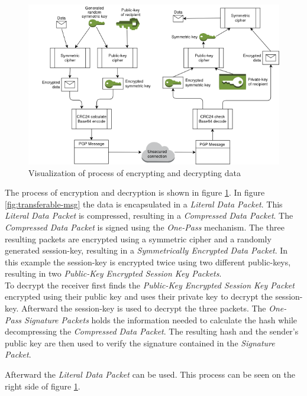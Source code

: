 \begin{figure}[h!]
	\centering
	\includegraphics[width=1\linewidth]{figures/encryption}
	\caption{Visualization of process of encrypting and decrypting data}
	\label{fig:encryption}
\end{figure}


The process of encryption and decryption is shown in figure \ref{fig:encryption}. In figure \ref{fig:transferable-msg} the data is encapsulated in a \textit{Literal Data Packet}. This \textit{Literal Data Packet} is compressed, resulting in a \textit{Compressed Data Packet}. The \textit{Compressed Data Packet} is signed using the \textit{One-Pass} mechanism. The three resulting packets are encrypted using a symmetric cipher and a randomly generated session-key, resulting in a \textit{Symmetrically Encrypted Data Packet}. In this example the session-key is encrypted twice using two different public-keys, resulting in two \textit{Public-Key Encrypted Session Key Packets}. \\


To decrypt the receiver first finds the\textit{ Public-Key Encrypted Session Key Packet} encrypted using their public key and uses their private key to decrypt the session-key. Afterward the session-key is used to decrypt the three packets. The \textit{One-Pass Signature Packets} holds the information needed to calculate the hash while decompressing the \textit{Compressed Data Packet}. The resulting hash and the sender's public key are then used to verify the signature contained in the \textit{Signature Packet}. 

Afterward the \textit{Literal Data Packet} can be used. This process can be seen on the right side of figure \ref{fig:encryption}.

